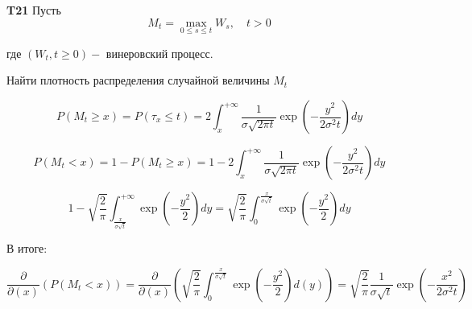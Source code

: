 \documentclass[a4paper,12pt]{article} %
\begin{document}
\begin{example} \textbf{T21}
Пусть
$$
M_{t}=\max _{0 \leq s \leq t} W_{s}, \quad t>0
$$

где $\left(W_{t}, t \geq 0\right)-$ винеровский процесс. 

Найти плотность распределения случайной величины $M_{t}$




$$
P\left(M_{t} \geq x\right)=P\left(\tau_{x} \leq t\right)=2 \int_{x}^{+\infty} \frac{1}{\sigma \sqrt{2 \pi t}} \exp \left(-\frac{y^{2}}{2 \sigma^{2} t}\right) dy
$$



$$
P\left(M_{t}<x\right)=1-P\left(M_{t} \geq x\right)=1-2 \int_{x}^{+\infty} \frac{1}{\sigma \sqrt{2 \pi t}} \exp \left(-\frac{y^{2}}{2 \sigma^{2} t}\right) dy
$$


$$
1-\sqrt{\frac{2}{\pi}} \int_{\frac{x}{\sigma \sqrt{t}}}^{+\infty} \exp \left(-\frac{y^{2}}{2}\right) dy
=\sqrt{\frac{2}{\pi}} \int_{0}^{\frac{x}{\sigma \sqrt{t}}} \exp \left(-\frac{y^{2}}{2}\right) dy
$$

В итоге:

$$
\frac{\partial}{\partial(x)}\left(P\left(M_{t}<x\right)\right)=\frac{\partial}{\partial(x)}\left(\sqrt{\frac{2}{\pi}} \int_{0}^{\frac{x}{\sigma \sqrt{t}}} \exp \left(-\frac{y^{2}}{2}\right) d(y)\right)=\sqrt{\frac{2}{\pi}} \frac{1}{\sigma \sqrt{t}} \exp \left(-\frac{x^{2}}{2 \sigma^{2} t}\right)
$$





\end{example}
\end{document}
